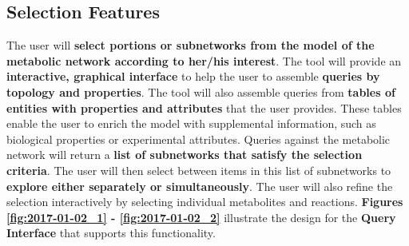 



\subsection{Selection Features}

The user will \textbf{select portions or subnetworks from the model of the metabolic network according to her/his interest}.
The tool will provide an \textbf{interactive, graphical interface} to help the user to assemble \textbf{queries by topology and properties}.
The tool will also assemble queries from \textbf{tables of entities with properties and attributes} that the user provides.
These tables enable the user to enrich the model with supplemental information, such as biological properties or experimental attributes.
Queries against the metabolic network will return a \textbf{list of subnetworks that satisfy the selection criteria}.
The user will then select between items in this list of subnetworks to \textbf{explore either separately or simultaneously}.
The user will also refine the selection interactively by selecting individual metabolites and reactions.
\textbf{Figures \ref{fig:2017-01-02_1} - \ref{fig:2017-01-02_2}} illustrate the design for the \textbf{Query Interface} that supports this functionality.

